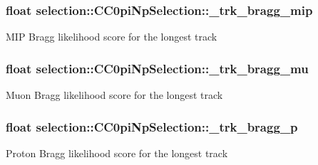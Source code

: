 \subsubsection[{\texorpdfstring{\+\_\+trk\+\_\+bragg\+\_\+mip}{_trk_bragg_mip}}]{\setlength{\rightskip}{0pt plus 5cm}float selection\+::\+C\+C0pi\+Np\+Selection\+::\+\_\+trk\+\_\+bragg\+\_\+mip\hspace{0.3cm}{\ttfamily [private]}}\hypertarget{classselection_1_1CC0piNpSelection_aec1e4d27216773ec40bc66ab5c217abc}{}\label{classselection_1_1CC0piNpSelection_aec1e4d27216773ec40bc66ab5c217abc}
M\+IP Bragg likelihood score for the longest track 
\subsubsection[{\texorpdfstring{\+\_\+trk\+\_\+bragg\+\_\+mu}{_trk_bragg_mu}}]{\setlength{\rightskip}{0pt plus 5cm}float selection\+::\+C\+C0pi\+Np\+Selection\+::\+\_\+trk\+\_\+bragg\+\_\+mu\hspace{0.3cm}{\ttfamily [private]}}\hypertarget{classselection_1_1CC0piNpSelection_a9e7b081beb0ef9129f15a7fb965276f1}{}\label{classselection_1_1CC0piNpSelection_a9e7b081beb0ef9129f15a7fb965276f1}
Muon Bragg likelihood score for the longest track 
\subsubsection[{\texorpdfstring{\+\_\+trk\+\_\+bragg\+\_\+p}{_trk_bragg_p}}]{\setlength{\rightskip}{0pt plus 5cm}float selection\+::\+C\+C0pi\+Np\+Selection\+::\+\_\+trk\+\_\+bragg\+\_\+p\hspace{0.3cm}{\ttfamily [private]}}\hypertarget{classselection_1_1CC0piNpSelection_a52d578481ee7dd4fed45f8e3c8ed44da}{}\label{classselection_1_1CC0piNpSelection_a52d578481ee7dd4fed45f8e3c8ed44da}
Proton Bragg likelihood score for the longest track 
